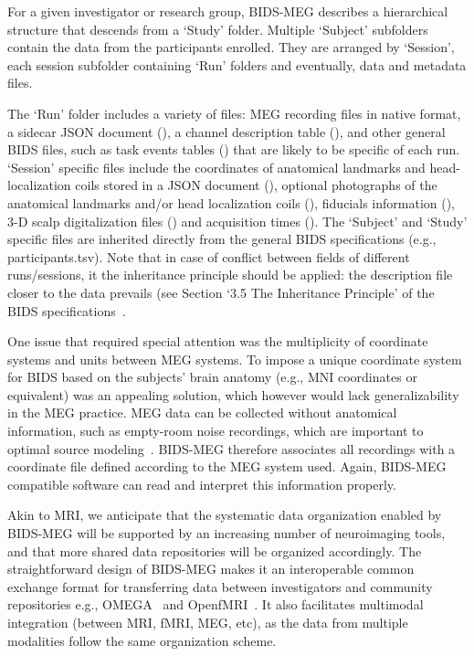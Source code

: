 For a given investigator or research group, BIDS-MEG describes a hierarchical structure that descends from a ‘Study’ folder. Multiple ‘Subject’ subfolders contain the data from the participants enrolled. They are arranged by ‘Session’, each session subfolder containing ‘Run’ folders and eventually, data and metadata files. 

The ‘Run’ folder includes a variety of files: MEG recording files in native format, a sidecar JSON document (), a channel description table (), and other general BIDS files, such as task events tables () that are likely to be specific of each run. ‘Session’ specific files include the coordinates of anatomical landmarks and head-localization coils stored in a JSON document (), optional photographs of the anatomical landmarks and/or head localization coils  (), fiducials information (), 3-D scalp digitalization files () and acquisition times (). The ‘Subject’ and ‘Study’ specific files are inherited directly from the general BIDS specifications (e.g., participants.tsv). Note that in case of conflict between fields of different runs/sessions, it the inheritance principle should be applied: the description file closer to the data prevails (see Section ‘3.5 The Inheritance Principle’ of the BIDS specifications~\citep{gorgolewski2016brain}.

One issue that required special attention was the multiplicity of coordinate systems and units between MEG systems. To impose a unique coordinate system for BIDS based on the subjects’ brain anatomy (e.g., MNI coordinates or equivalent) was an appealing solution, which however would lack generalizability in the MEG practice. MEG data can be collected without anatomical information, such as empty-room noise recordings, which are important to optimal source modeling~\citep{gross-etal:13}. BIDS-MEG therefore associates all recordings with a coordinate file defined according to the MEG system used. Again, BIDS-MEG compatible software can read and interpret this information properly.

Akin to MRI, we anticipate that the systematic data organization enabled by BIDS-MEG will be supported by an increasing number of neuroimaging tools, and that more shared data repositories will be organized accordingly. The straightforward design of BIDS-MEG makes it an interoperable common exchange format for transferring data between investigators and community repositories e.g., OMEGA~\citep{niso2016omega} and OpenfMRI~\citep{poldrack2017openfmri}. It also facilitates multimodal integration (between MRI, fMRI, MEG, etc), as the data from multiple modalities follow the same organization scheme.

